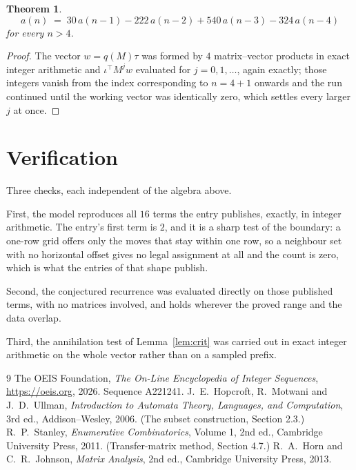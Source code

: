 \documentclass[11pt,a4paper]{article}
\theoremstyle{plain}
\newtheorem{theorem}{Theorem}
\theoremstyle{definition}
\begin{document}
\begin{theorem}
\[
a(n)\;=\;30\,a(n-1) - 222\,a(n-2) + 540\,a(n-3) - 324\,a(n-4)
\]
for every $n>4$.
\end{theorem}

\begin{proof}
The vector $w=q(M)\tau$ was formed by $4$ matrix--vector products in exact integer
arithmetic and $\iota^{\!\top}M^{j}w$ evaluated for $j=0,1,\dots$, again exactly; those
integers vanish from the index corresponding to $n=4+1$ onwards and the run continued
until the working vector was identically zero, which settles every larger $j$ at once.
\end{proof}

\section{Verification}

Three checks, each independent of the algebra above.

First, the model reproduces all $16$ terms the entry publishes, exactly, in integer
arithmetic. The entry's first term is $2$, and it is a sharp test of the boundary: a
one-row grid offers only the moves that stay within one row, so a neighbour set with no
horizontal offset gives no legal assignment at all and the count is zero, which is what the
entries of that shape publish.

Second, the conjectured recurrence was evaluated directly on those published terms, with no
matrices involved, and holds wherever the proved range and the data overlap.

Third, the annihilation test of Lemma~\ref{lem:crit} was carried out in exact integer
arithmetic on the whole vector rather than on a sampled prefix.

\begin{thebibliography}{9}
 The OEIS Foundation, \emph{The On-Line Encyclopedia of Integer
Sequences}, \url{https://oeis.org}, 2026. Sequence A221241.
 J.~E.~Hopcroft, R.~Motwani and J.~D.~Ullman, \emph{Introduction to Automata
Theory, Languages, and Computation}, 3rd ed., Addison--Wesley, 2006. (The subset
construction, Section 2.3.)
 R.~P.~Stanley, \emph{Enumerative Combinatorics}, Volume 1, 2nd ed.,
Cambridge University Press, 2011. (Transfer-matrix method, Section 4.7.)
 R.~A.~Horn and C.~R.~Johnson, \emph{Matrix Analysis}, 2nd ed., Cambridge
University Press, 2013.
\end{thebibliography}
\end{document}
